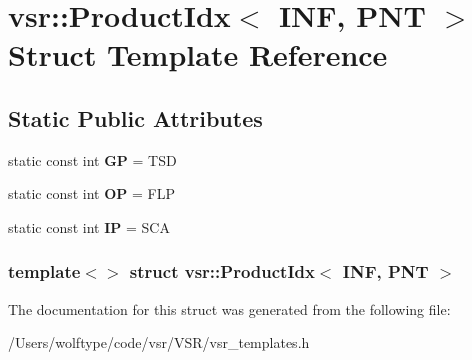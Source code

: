 \hypertarget{structvsr_1_1_product_idx_3_01_i_n_f_00_01_p_n_t_01_4}{\section{vsr\-:\-:Product\-Idx$<$ I\-N\-F, P\-N\-T $>$ Struct Template Reference}
\label{structvsr_1_1_product_idx_3_01_i_n_f_00_01_p_n_t_01_4}
}
\subsection*{Static Public Attributes}
\begin{DoxyCompactItemize}
\item 
\hypertarget{structvsr_1_1_product_idx_3_01_i_n_f_00_01_p_n_t_01_4_a7fa05aeb54a75a6214eff666d6333821}{static const int {\bfseries G\-P} = T\-S\-D}\label{structvsr_1_1_product_idx_3_01_i_n_f_00_01_p_n_t_01_4_a7fa05aeb54a75a6214eff666d6333821}

\item 
\hypertarget{structvsr_1_1_product_idx_3_01_i_n_f_00_01_p_n_t_01_4_a8d3861b1f1127f378e3346974ea82061}{static const int {\bfseries O\-P} = F\-L\-P}\label{structvsr_1_1_product_idx_3_01_i_n_f_00_01_p_n_t_01_4_a8d3861b1f1127f378e3346974ea82061}

\item 
\hypertarget{structvsr_1_1_product_idx_3_01_i_n_f_00_01_p_n_t_01_4_a88933701c8fadffa94d7d77126235b9c}{static const int {\bfseries I\-P} = S\-C\-A}\label{structvsr_1_1_product_idx_3_01_i_n_f_00_01_p_n_t_01_4_a88933701c8fadffa94d7d77126235b9c}

\end{DoxyCompactItemize}
\subsubsection*{template$<$$>$ struct vsr\-::\-Product\-Idx$<$ I\-N\-F, P\-N\-T $>$}



The documentation for this struct was generated from the following file\-:\begin{DoxyCompactItemize}
\item 
/\-Users/wolftype/code/vsr/\-V\-S\-R/vsr\-\_\-templates.\-h\end{DoxyCompactItemize}
